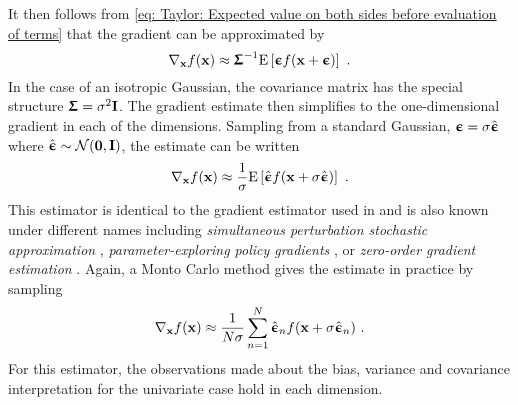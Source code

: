 It then follows from \eqref{eq: Taylor: Expected value on both sides before evaluation of terms} that the gradient can be approximated by
\begin{equation}\label{eq: Theory: Taylor: Multivariate gradient estimator}
    \nabla_{\mathbf{x}} f({\mathbf{x}}) \approx {\boldsymbol{\Upsigma}}^{-1}\text{E}\left[{\boldsymbol{\upepsilon}} f({\mathbf{x}}+{\boldsymbol{\upepsilon}})\right] \ .
\end{equation}
In the case of an isotropic Gaussian, the covariance matrix has the special structure ${\boldsymbol{\Upsigma}}=\sigma^2{\mathbf{I}}$. The gradient estimate then simplifies to the one-dimensional gradient in each of the dimensions. Sampling from a standard Gaussian, ${\boldsymbol{\upepsilon}} = \sigma\hat{{\boldsymbol{\upepsilon}}}$ where $\hat{{\boldsymbol{\upepsilon}}}\sim\mathcal{N}({\mathbf{0}},{\mathbf{I}})$, the estimate can be written
\begin{equation}\label{eq: Theory: Taylor: Multivariate gradient estimate from standard Gaussian}
    \nabla_{\mathbf{x}} f({\mathbf{x}}) \approx \frac{1}{\sigma}\text{E}\left[\hat{{\boldsymbol{\upepsilon}}} f({\mathbf{x}}+\sigma\hat{{\boldsymbol{\upepsilon}}})\right] \ .
\end{equation}
This estimator is identical to the gradient estimator used in \cite{Salimans2017} and is also known under different names including \textit{simultaneous perturbation stochastic approximation} \cite{Spall1992}, \textit{parameter-exploring policy gradients} \cite{Sehnke2010}, or \textit{zero-order gradient estimation} \cite{Nesterov2017}. Again, a Monto Carlo method gives the estimate in practice by sampling
\begin{equation}
    \nabla_{\mathbf{x}} f({\mathbf{x}}) \approx \frac{1}{N\sigma} \sum_{n=1}^N \hat{{\boldsymbol{\upepsilon}}}_n f({\mathbf{x}}+\sigma\hat{{\boldsymbol{\upepsilon}}}_n) \ .
\end{equation}
For this estimator, the observations made about the bias, variance and covariance interpretation for the univariate case hold in each dimension.


\iffalse
\begin{equation}
    \epsilonb\transpose\H_\x f(\x)\epsilonb = \sum_{i=1}^n \sum_{j=1}^n h_{i,j}\epsilonb_i\epsilonb_j.
\end{equation}

\begin{align*}
    E[X^TAX] &= E\left[\sum_{i=1}^n \sum_{j=1}^n a_{i,j}X_iX_j\right]\\
    &= \sum_{i=1}^n \sum_{j=1}^n a_{i,j}E[X_iX_j]
    & \text{by linearity of expectation}\\
    &= \sum_{i=1}^n \sum_{j=1}^n a_{i,j}(\sigma_{i,j}+\mu_i\mu_j)
    &\text{apply covariance formula}\\
    &= \sum_{i=1}^n \sum_{j=1}^n a_{i,j}\sigma_{j,i}
    +\sum_{i=1}^n \sum_{j=1}^n a_{i,j}\mu_i\mu_j
    &\text{since}~\Sigma~\text{is a symmetric matrix}\\
    &= \sum_{i=1}^n [A\Sigma]_{i,i} + \mu^TA\mu\\
    &= \text{tr}(A\Sigma) + \mu^TA\mu
\end{align*}
\fi

